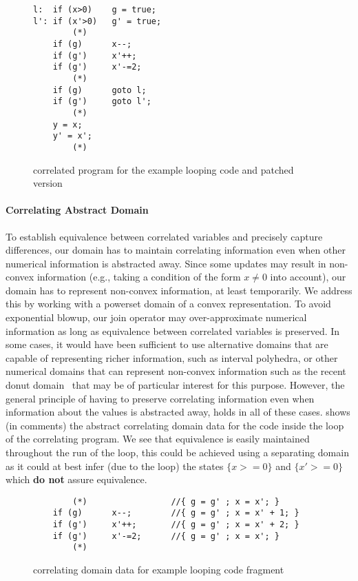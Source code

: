 \begin{figure}[ht]
\begin{lstlisting}
l:  if (x>0)    g = true;
l': if (x'>0)   g' = true;
        (*)
    if (g)      x--;
    if (g')     x'++;
    if (g')     x'-=2;
        (*)
    if (g)      goto l;
    if (g')     goto l';
        (*)
    y = x;
    y' = x';
        (*)
\end{lstlisting}
\caption{correlated program for the example looping code and patched version}
\end{figure}

\paragraph{Correlating Abstract Domain} To establish equivalence between correlated variables and precisely capture differences, our domain has to maintain correlating information even when other numerical information is abstracted away. Since some updates may result in non-convex information (e.g., taking a condition of the form $x \neq 0$ into account), our domain has to represent non-convex information, at least temporarily. We address this by working with a powerset domain of a convex representation. To avoid exponential blowup, our join operator may over-approximate numerical information as long as equivalence between correlated variables is preserved. In some cases, it would have been sufficient to use alternative domains that are capable of representing richer information, such as interval polyhedra, or other numerical domains that can represent non-convex information such as the recent donut domain~\cite{Donut} that may be of particular interest for this purpose. However, the general principle of having to preserve correlating information even when information about the values is abstracted away, holds in all of these cases.  shows (in comments) the abstract correlating domain data for the code inside the loop of the correlating program. We see that equivalence is easily maintained throughout the run of the loop, this could be achieved using a separating domain as it could at best infer (due to the loop) the states $\{x>=0\}$ and $\{x'>=0\}$ which \textbf{do not} assure equivalence.

\begin{figure}[ht]
\begin{lstlisting}
        (*)                 //{ g = g' ; x = x'; }
    if (g)      x--;        //{ g = g' ; x = x' + 1; }
    if (g')     x'++;       //{ g = g' ; x = x' + 2; }
    if (g')     x'-=2;      //{ g = g' ; x = x'; }
        (*)
\end{lstlisting}
\caption{correlating domain data for example looping code fragment}
\end{figure}

